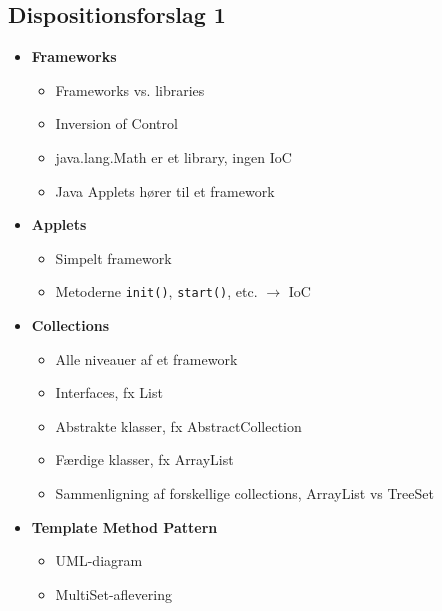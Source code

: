 \subsection{Dispositionsforslag 1}

\begin{itemize}
    \item \textbf{Frameworks}
    \begin{itemize}
        \item Frameworks vs. libraries
        \item Inversion of Control
        \item java.lang.Math er et library, ingen IoC
        \item Java Applets hører til et framework
    \end{itemize}
    
    \item \textbf{Applets}
    \begin{itemize}
        \item Simpelt framework
        \item Metoderne \verb|init()|, \verb|start()|, etc. $\rightarrow$ IoC
    \end{itemize}
    
    \item \textbf{Collections}
    \begin{itemize}
        \item Alle niveauer af et framework
        \item Interfaces, fx List
        \item Abstrakte klasser, fx AbstractCollection
        \item Færdige klasser, fx ArrayList
        \item Sammenligning af forskellige collections, ArrayList vs TreeSet
    \end{itemize}
    
    \item \textbf{Template Method Pattern}
    \begin{itemize}
        \item UML-diagram
        \item MultiSet-aflevering
    \end{itemize}
    
\end{itemize}
